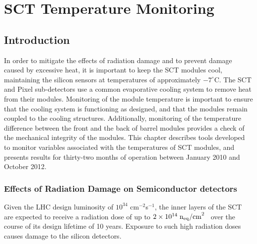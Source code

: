 \graphicspath{{Chapters/SCT/Figures/}}

\chapter{SCT Temperature Monitoring}
\label{chap:SCT}

\section{Introduction}

In order to mitigate the effects of radiation damage and to prevent damage
caused by excessive heat, it is important to keep the SCT modules cool,
maintaining the silicon sensors at temperatures of approximately $-7^{\circ}$C.
The SCT and Pixel sub-detectors use a common evaporative cooling system to
remove heat from their modules. Monitoring of the module temperature is
important to ensure that the cooling system is functioning as designed, and that
the modules remain coupled to the cooling structures.  Additionally, monitoring
of the temperature difference between the front and the back of barrel modules
provides a check of the mechanical integrity of the modules. This chapter
describes tools developed to monitor variables associated with the temperatures
of SCT modules, and presents results for thirty-two months of operation between
January 2010 and October 2012.



\subsection{Effects of Radiation Damage on Semiconductor detectors}

Given the LHC design luminosity of $10^{34}$ cm$^{-2}$s$^{-1}$, the inner layers
of the SCT are expected to receive a radiation dose of up to
$2\times10^{14}\;\rm{n_{eq}/cm}^2$~\cite{Ahmad200798} over the course of its
design lifetime of 10 years.  Exposure to such high radiation doses causes
damage to the silicon detectors. 

